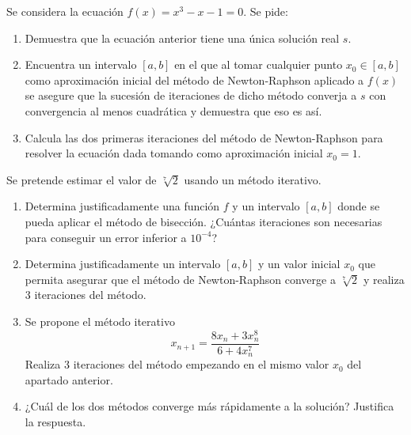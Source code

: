 \begin{ejercicio}
    Se considera la ecuación $f(x) = x^3 - x - 1 = 0$. Se pide:
    \begin{enumerate}
        \item Demuestra que la ecuación anterior tiene una única solución real $s$.
        \item Encuentra un intervalo $[a, b]$ en el que al tomar cualquier punto $x_0 \in [a, b]$ como aproximación inicial del método de Newton-Raphson aplicado a $f(x)$ se asegure que la sucesión de iteraciones de dicho método converja a $s$ con convergencia al menos cuadrática y demuestra que eso es así.
        \item Calcula las dos primeras iteraciones del método de Newton-Raphson para resolver la ecuación dada tomando como aproximación inicial $x_0 = 1$.
    \end{enumerate}
\end{ejercicio}

\begin{ejercicio}
    Se pretende estimar el valor de $\sqrt[7]{2}$ usando un método iterativo.
    \begin{enumerate}
        \item Determina justificadamente una función $f$ y un intervalo $[a, b]$ donde se pueda aplicar el método de bisección. ¿Cuántas iteraciones son necesarias para conseguir un error inferior a $10^{-4}$?
        \item Determina justificadamente un intervalo $[a, b]$ y un valor inicial $x_0$ que permita asegurar que el método de Newton-Raphson converge a $\sqrt[7]{2}$ y realiza 3 iteraciones del método.
        \item Se propone el método iterativo
        \[
            x_{n+1} = \frac{8x_n + 3x_n^8}{6 + 4x_n^7}
        \]
        Realiza 3 iteraciones del método empezando en el mismo valor $x_0$ del apartado anterior.
        \item ¿Cuál de los dos métodos converge más rápidamente a la solución? Justifica la respuesta.
    \end{enumerate}
\end{ejercicio}

